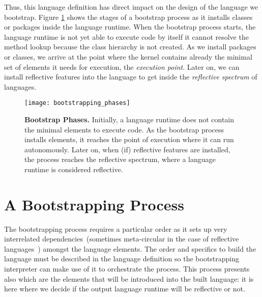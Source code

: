 Thus, this language definition has direct impact on the design of the language we bootstrap. Figure \ref{fig:phases} shows the stages of a bootstrap process as it installs classes or packages inside the language runtime. When the bootstrap process starts, the language runtime is not yet able to execute code by itself \eg it cannot resolve the method lookup because the class hierarchy is not created. As we install packages or classes, we arrive at the point where the kernel contains already the minimal set of elements it needs for execution, the \emph{execution point}. Later on, we can install reflective features into the language to get inside the \emph{reflective spectrum} of languages. 



\begin{figure}[ht]
\center
\texttt{[image: bootstrapping\_phases]}
\caption{\textbf{Bootstrap Phases.} Initially, a language runtime does not contain the minimal elements to execute code. As the bootstrap process installs elements, it reaches the point of execution where it can run autonomously. Later on, when (if) reflective features are installed, the process reaches the reflective spectrum, where a language runtime is considered reflective.\label{fig:phases}}
\end{figure}

%

\section{A Bootstrapping Process}
The bootstrapping process requires a particular order as it sets up very interrelated dependencies~(sometimes meta-circular in the case of reflective languages~\cite{Stra14a,Chib96a,Maes87a,Smit84a}) amongst the language elements. The order and specifics to build the language must be described in the language definition so the bootstrapping interpreter can make use of it to orchestrate the process. This process presents also which are the elements that will be introduced into the built language: it is here where we decide if the output language runtime will be reflective or not.

